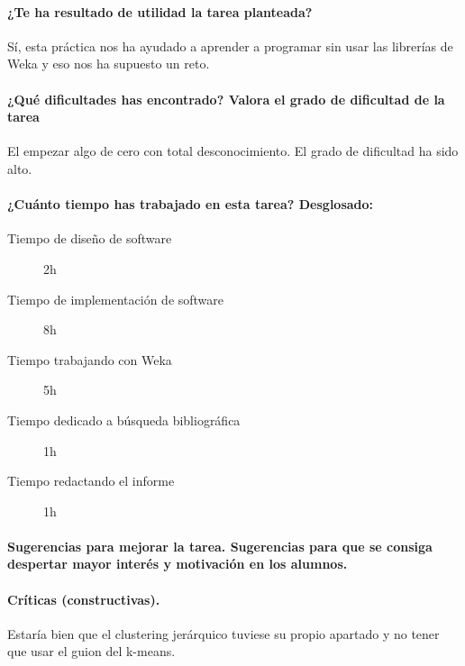 \documentclass[11pt, titlepage,a4paper]{article}
\begin{document}
\paragraph{¿Te ha resultado de utilidad la tarea planteada?\\}
Sí, esta práctica nos ha ayudado a aprender a programar sin usar las librerías de Weka y eso nos ha supuesto un reto.
 \paragraph{¿Qué dificultades has encontrado? Valora el grado de dificultad de
la tarea\\}
El empezar algo de cero con total desconocimiento. El grado de dificultad ha
sido alto.
\paragraph{¿Cuánto tiempo has trabajado en esta tarea? Desglosado:\\}
\begin{description}
	\item[Tiempo de diseño de software] 2h
	\item[Tiempo de implementación de software] 8h
	\item[Tiempo trabajando con Weka] 5h
	\item[Tiempo dedicado a búsqueda bibliográfica] 1h
	\item[Tiempo redactando el informe] 1h
\end{description}

\paragraph{Sugerencias para mejorar la tarea. Sugerencias para que se consiga despertar mayor
interés y motivación en los alumnos.\\}

\paragraph{Críticas (constructivas).\\}
Estaría bien que el clustering jerárquico tuviese su propio apartado y no tener
que usar el guion del k-means.
\end{document}

